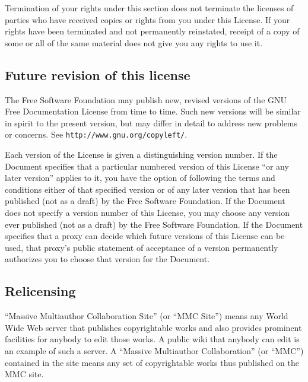 \documentclass[letterpaper,twoside]{scrartcl}
\begin{document}
   Termination of your rights under this section does not terminate the
   licenses of parties who have received copies or rights from you under
   this License.  If your rights have been terminated and not permanently
   reinstated, receipt of a copy of some or all of the same material does
   not give you any rights to use it.


   
   
   \subsection{Future revision of this license}
   


   The Free Software Foundation may publish new, revised versions
   of the GNU Free Documentation License from time to time.  Such new
   versions will be similar in spirit to the present version, but may
   differ in detail to address new problems or concerns.  See
   \texttt{http://www.gnu.org/copyleft/}.

   Each version of the License is given a distinguishing version number.
   If the Document specifies that a particular numbered version of this
   License ``or any later version'' applies to it, you have the option of
   following the terms and conditions either of that specified version or
   of any later version that has been published (not as a draft) by the
   Free Software Foundation.  If the Document does not specify a version
   number of this License, you may choose any version ever published (not
   as a draft) by the Free Software Foundation.  If the Document
   specifies that a proxy can decide which future versions of this
   License can be used, that proxy's public statement of acceptance of a
   version permanently authorizes you to choose that version for the
   Document.


   
   
   \subsection{Relicensing}
   


   ``Massive Multiauthor Collaboration Site'' (or ``MMC Site'') means any
   World Wide Web server that publishes copyrightable works and also
   provides prominent facilities for anybody to edit those works.  A
   public wiki that anybody can edit is an example of such a server.  A
   ``Massive Multiauthor Collaboration'' (or ``MMC'') contained in the
   site means any set of copyrightable works thus published on the MMC
   site.
\end{document}

